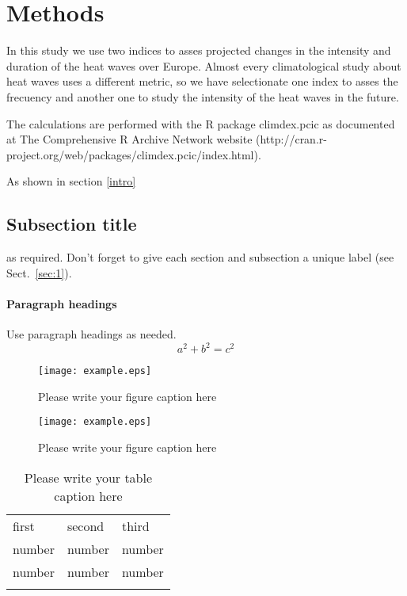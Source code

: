 \section{Methods}

In this study we use two indices to asses projected changes in the intensity and duration of the heat waves over Europe. Almost every climatological study about heat waves  uses a different metric, so we have selectionate one index to asses the frecuency and another one to study the intensity of the heat waves  in the future.   

The calculations are performed with the R package climdex.pcic as documented at The Comprehensive R Archive Network website (http://cran.r-project.org/web/packages/climdex.pcic/index.html).  

As shown in section \ref{intro}
\label{sec:1}
\subsection{Subsection title}
\label{sec:2}
as required. Don't forget to give each section
and subsection a unique label (see Sect.~\ref{sec:1}).
\paragraph{Paragraph headings} Use paragraph headings as needed.
\begin{equation}
a^2+b^2=c^2
\end{equation}

\begin{figure}
  \texttt{[image: example.eps]}
\caption{Please write your figure caption here}
\label{fig:1}       %
\end{figure}
%
\begin{figure*}
  \texttt{[image: example.eps]}
\caption{Please write your figure caption here}
\label{fig:2}       %
\end{figure*}
%
\begin{table}
\caption{Please write your table caption here}
\label{tab:1}       %
\begin{tabular}{lll}
\hline\noalign{\smallskip}
first & second & third  \\
\noalign{\smallskip}\hline\noalign{\smallskip}
number & number & number \\
number & number & number \\
\noalign{\smallskip}\hline
\end{tabular}
\end{table}


